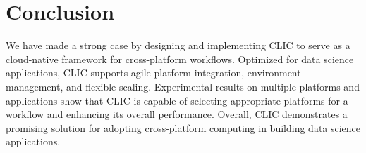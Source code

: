 
\section{Conclusion}
We have made a strong case by designing and implementing CLIC to serve as a cloud-native framework for cross-platform workflows. Optimized for data science applications, CLIC supports agile platform integration, environment management, and flexible scaling. Experimental results on multiple platforms and applications show that CLIC is capable of selecting appropriate platforms for a workflow and enhancing its overall performance. Overall, CLIC demonstrates a promising solution for adopting cross-platform computing in building data science applications. 
